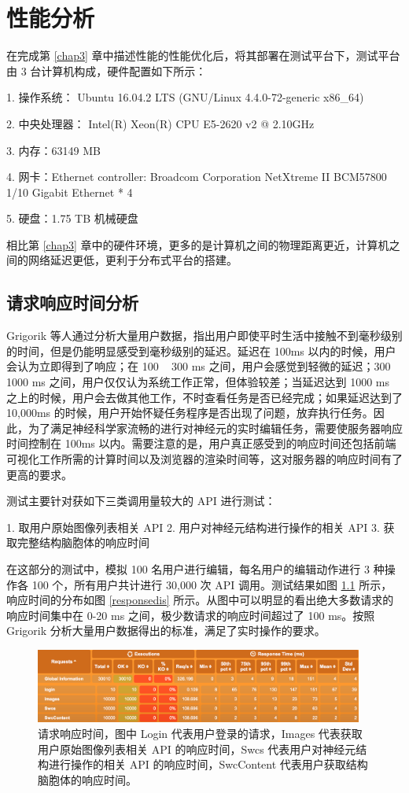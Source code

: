 \chapter{性能分析}

在完成第 \ref{chap3} 章中描述性能的性能优化后，将其部署在测试平台下，测试平台由 3 台计算机构成，硬件配置如下所示：

1. 操作系统： Ubuntu 16.04.2 LTS (GNU/Linux 4.4.0-72-generic x86\_64)

2. 中央处理器： Intel(R) Xeon(R) CPU E5-2620 v2 @ 2.10GHz

3. 内存：63149 MB

4. 网卡：Ethernet controller: Broadcom Corporation NetXtreme II BCM57800 1/10 Gigabit Ethernet * 4

5. 硬盘：1.75 TB 机械硬盘

相比第 \ref{chap3} 章中的硬件环境，更多的是计算机之间的物理距离更近，计算机之间的网络延迟更低，更利于分布式平台的搭建。

\section{请求响应时间分析}
Grigorik 等人通过分析大量用户数据，指出用户即使平时生活中接触不到毫秒级别的时间，但是仍能明显感受到毫秒级别的延迟。延迟在 100ms 以内的时候，用户会认为立即得到了响应；在 100 ~ 300 ms 之间，用户会感觉到轻微的延迟；300 ~ 1000 ms 之间，用户仅仅认为系统工作正常，但体验较差；当延迟达到 1000 ms 之上的时候，用户会去做其他工作，不时查看任务是否已经完成；如果延迟达到了 10,000ms 的时候，用户开始怀疑任务程序是否出现了问题，放弃执行任务。因此，为了满足神经科学家流畅的进行对神经元的实时编辑任务，需要使服务器响应时间控制在 100ms 以内。需要注意的是，用户真正感受到的响应时间还包括前端可视化工作所需的计算时间以及浏览器的渲染时间等，这对服务器的响应时间有了更高的要求。

测试主要针对获如下三类调用量较大的 API 进行测试：

1. 取用户原始图像列表相关 API
2. 用户对神经元结构进行操作的相关 API
3. 获取完整结构脑胞体的响应时间

在这部分的测试中，模拟 100 名用户进行编辑，每名用户的编辑动作进行 3 种操作各 100 个，所有用户共计进行 30,000 次 API 调用。测试结果如图 \ref{response} 所示，响应时间的分布如图 \ref{responsedis} 所示。从图中可以明显的看出绝大多数请求的响应时间集中在 0-20 ms 之间，极少数请求的响应时间超过了 100 ms。按照 Grigorik 分析大量用户数据得出的标准，满足了实时操作的要求。

\begin{figure}
\centering
\includegraphics[width=108mm]{images/response}
\caption{请求响应时间，图中 Login 代表用户登录的请求，Images 代表获取用户原始图像列表相关 API 的响应时间，Swcs 代表用户对神经元结构进行操作的相关 API 的响应时间，SwcContent 代表用户获取结构脑胞体的响应时间。}
\label{response}
\end{figure}

